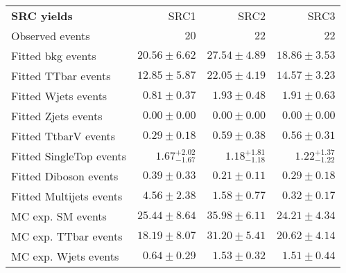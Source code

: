 

\begin{table}
\begin{center}
\setlength{\tabcolsep}{0.0pc}
{\small
\begin{tabular*}{\textwidth}{@{\extracolsep{\fill}}lrrr}
\noalign{\smallskip}\hline\noalign{\smallskip}
{\bf SRC yields}           & SRC1            & SRC2            & SRC3              \\[-0.05cm]
\noalign{\smallskip}\hline\noalign{\smallskip}
Observed events          & $20$              & $22$              & $22$                    \\
\noalign{\smallskip}\hline\noalign{\smallskip}
Fitted bkg events         & $20.56 \pm 6.62$          & $27.54 \pm 4.89$          & $18.86 \pm 3.53$              \\
\noalign{\smallskip}\hline\noalign{\smallskip}
        Fitted TTbar events         & $12.85 \pm 5.87$          & $22.05 \pm 4.19$          & $14.57 \pm 3.23$              \\
        Fitted Wjets events         & $0.81 \pm 0.37$          & $1.93 \pm 0.48$          & $1.91 \pm 0.63$              \\
        Fitted Zjets events         & $0.00 \pm 0.00$          & $0.00 \pm 0.00$          & $0.00 \pm 0.00$              \\
        Fitted TtbarV events         & $0.29 \pm 0.18$          & $0.59 \pm 0.38$          & $0.56 \pm 0.31$              \\
        Fitted SingleTop events         & $1.67_{-1.67}^{+2.02}$          & $1.18_{-1.18}^{+1.81}$          & $1.22_{-1.22}^{+1.37}$              \\
        Fitted Diboson events         & $0.39 \pm 0.33$          & $0.21 \pm 0.11$          & $0.29 \pm 0.18$              \\
        Fitted Multijets events         & $4.56 \pm 2.38$          & $1.58 \pm 0.77$          & $0.32 \pm 0.17$              \\
 \noalign{\smallskip}\hline\noalign{\smallskip}
MC exp. SM events              & $25.44 \pm 8.64$          & $35.98 \pm 6.11$          & $24.21 \pm 4.34$              \\
\noalign{\smallskip}\hline\noalign{\smallskip}
        MC exp. TTbar events         & $18.19 \pm 8.07$          & $31.20 \pm 5.41$          & $20.62 \pm 4.14$              \\
        MC exp. Wjets events         & $0.64 \pm 0.29$          & $1.53 \pm 0.32$          & $1.51 \pm 0.44$              \\

\end{tabular*}}
\end{center}
\end{table}
